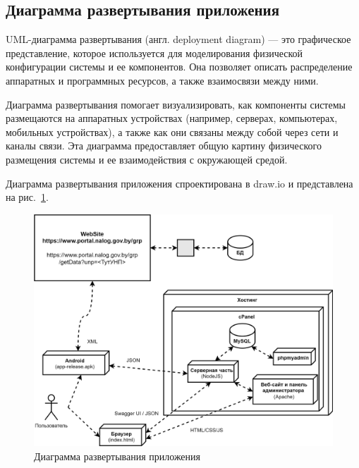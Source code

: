 \subsection*{Диаграмма развертывания приложения}

UML-диаграмма развертывания (англ. deployment diagram) — это графическое представление, которое используется для моделирования физической конфигурации системы и ее компонентов. Она позволяет описать распределение аппаратных и программных ресурсов, а также взаимосвязи между ними.

Диаграмма развертывания помогает визуализировать, как компоненты системы размещаются на аппаратных устройствах (например, серверах, компьютерах, мобильных устройствах), а также как они связаны между собой через сети и каналы связи. Эта диаграмма предоставляет общую картину физического размещения системы и ее взаимодействия с окружающей средой.



Диаграмма развертывания приложения спроектирована в draw.io и представлена на рис.~\ref{fig:UML_deployment_diagram_prod}.

\begin{figure}[!htb]
    \centering

    \includegraphics[width=18cm]
    {images/UML/UML_deployment_diagram_prod.png}

    \caption{Диаграмма развертывания приложения}

    \label{fig:UML_deployment_diagram_prod}
\end{figure}
